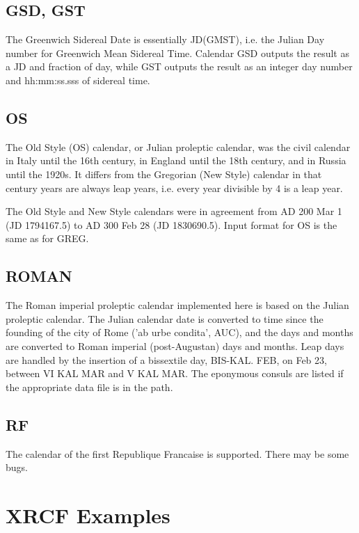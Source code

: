 \documentclass{article}
\begin{document}
\subsection{GSD, GST}

The Greenwich Sidereal Date is essentially JD(GMST),
i.e. the Julian Day number for Greenwich Mean Sidereal
Time. Calendar GSD outputs the result as a JD and
fraction of day, while GST outputs the result as
an integer day number and hh:mm:ss.sss of sidereal
time.

\subsection{OS}

The Old Style (OS) calendar, or Julian proleptic calendar, 
was the civil calendar in Italy until the 16th century,
in England until the 18th century, and in Russia until
the 1920s. It differs from the Gregorian (New Style) calendar in that
century years are always leap years, i.e. every year
divisible by 4 is a leap year.

The Old Style and New Style calendars were in agreement
from AD 200 Mar 1 (JD 1794167.5) to AD 300 Feb 28 (JD 1830690.5). 
Input format for OS is the same as for GREG.

\subsection{ROMAN}

The Roman imperial proleptic calendar implemented here
is based on the Julian proleptic calendar. The Julian calendar
date is converted to time since the founding of the city of
Rome ('ab urbe condita', AUC), and the days and months
are converted to Roman imperial (post-Augustan) days and months. 
Leap days are handled by the insertion of a bissextile day,
BIS-KAL. FEB, on Feb 23, between VI KAL MAR and V KAL MAR.
The eponymous consuls are listed if the appropriate data
file is in the path.

\subsection{RF}

The calendar of the first Republique Francaise is supported.
There may be some bugs.


\section{XRCF Examples}
\end{document}
